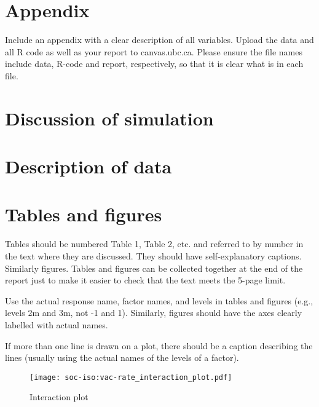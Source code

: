 \documentclass[12pt,a4paper]{article}
\begin{document}
\renewcommand\theequation{\Alph{section}\arabic{equation}} %
\renewcommand\thefigure{\Alph{section}\arabic{figure}} %
\renewcommand\thetable{\Alph{section}\arabic{table}} %


\begin{appendices}

\section*{Appendix}

Include an appendix with a clear description of all variables. Upload
the data and all R code as well as your report to canvas.ubc.ca. Please ensure the file
names include data, R-code and report, respectively, so that it is clear what is in each
file.

\section{Discussion of simulation}

\section{Description of data}

\section{Tables and figures}

Tables should be numbered Table 1, Table 2, etc. and referred
to by number in the text where they are discussed. They should have self-explanatory
captions. Similarly figures. Tables and figures can be collected together at the end of the
report just to make it easier to check that the text meets the 5-page limit.

Use the actual response name, factor names, and levels in tables and figures (e.g., levels
2m and 3m, not -1 and 1). Similarly, figures should have the axes clearly labelled with
actual names.

If more than one line is drawn on a plot, there should be a caption describing the lines
(usually using the actual names of the levels of a factor).

\begin{figure}[H]
\texttt{[image: soc-iso:vac-rate\_interaction\_plot.pdf]}
\caption{Interaction plot}	 %
\label{soc.iso:vac.rate_interaction}
\end{figure}




\end{appendices}
\end{document}
